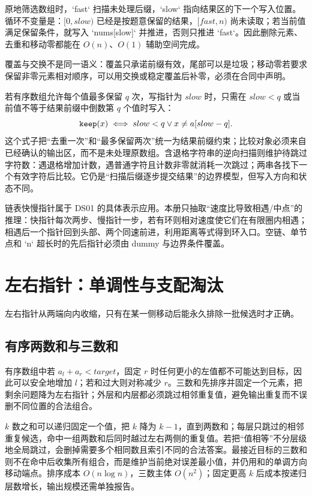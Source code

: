 \documentclass[UTF8,fontset=none,11pt,a4paper]{ctexart}
\begin{document}
原地筛选数组时，`fast` 扫描未处理后缀，`slow` 指向结果区的下一个写入位置。循环不变量是：$[0,slow)$ 已经是按题意保留的结果，$[fast,n)$ 尚未读取；若当前值满足保留条件，就写入 `nums[slow]` 并推进，否则只推进 `fast`。因此删除元素、去重和移动零都能在 $O(n)$、$O(1)$ 辅助空间完成。

覆盖与交换不是同一语义：覆盖只承诺前缀有效，尾部可以是垃圾；移动零若要求保留非零元素相对顺序，可以用交换或稳定覆盖后补零，必须在合同中声明。

若有序数组允许每个值最多保留 $q$ 次，写指针为 $slow$ 时，只需在 $slow<q$ 或当前值不等于结果前缀中倒数第 $q$ 个值时写入：
\[
\texttt{keep}(x)\iff slow<q\lor x\ne a[slow-q].
\]
这个式子把“去重一次”和“最多保留两次”统一为结果前缀约束；比较对象必须来自已经确认的输出区，而不是未处理原数组。含退格字符串的逆向扫描则维护待跳过字符数：遇退格增加计数，遇普通字符且计数非零就消耗一次跳过；两串各找下一个有效字符后比较。它仍是“扫描后缀逐步提交结果”的边界模型，但写入方向和状态不同。

链表快慢指针属于 DS01 的具体表示应用。本册只抽取“速度比导致相遇/中点”的推理：快指针每次两步、慢指针一步，若有环则相对速度使它们在有限圈内相遇；相遇后一个指针回到头部、两个同速前进，利用距离等式得到环入口。空链、单节点和 `n` 超长时的先后指针必须由 dummy 与边界条件覆盖。

\section{左右指针：单调性与支配淘汰}

左右指针从两端向内收缩，只有在某一侧移动后能永久排除一批候选时才正确。

\subsection{有序两数和与三数和}

有序数组中若 $a_l+a_r<target$，固定 $r$ 时任何更小的左值都不可能达到目标，因此可以安全地增加 $l$；若和过大则对称减少 $r$。三数和先排序并固定一个元素，把剩余问题降为左右指针；外层和内层都必须跳过相邻重复值，避免输出重复而不误删不同位置的合法组合。

$k$ 数之和可以递归固定一个值，把 $k$ 降为 $k-1$，直到两数和；每层只跳过的相邻重复候选，命中一组两数和后同时越过左右两侧的重复值。若把“值相等”不分层级地全局跳过，会删掉需要多个相同数且索引不同的合法答案。最接近目标的三数和则不在命中后收集所有组合，而是维护当前绝对误差最小值，并仍用和的单调方向移动端点。排序成本 $O(n\log n)$，三数主体 $O(n^2)$；固定更高 $k$ 后成本按递归层数增长，输出规模还需单独报告。
\end{document}
